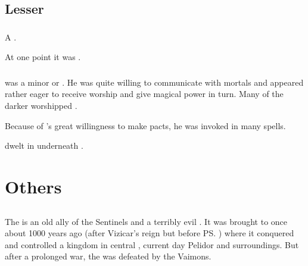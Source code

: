 \section{Lesser \XzaiShanns}





\subsection{\HothNrul}
\index{\HothNrul}
A \theraton. 

At one point it was . 





\subsection{\Yolbaoth}
\index{\Yolbaoth}
\Yolbaoth was a minor \xs or \theraton. 
He was quite willing to communicate with mortals and appeared rather eager to receive worship and give magical power in turn. 
Many of the darker  worshipped \Yolbaoth. 

Because of \Yolbaoth's great willingness to make pacts, he was invoked in many \draconic spells. 

\Yolbaoth dwelt in  underneath \Azmith. 















\chapter{Others}















\section{\Haskelek}
The \Haskelek{} is an old ally of the Sentinels and a terribly evil \daemon. 
It was brought to \Miith{} once about 1000 years ago (after Vizicar's reign but before \ps{\Belzir}) where it conquered and controlled a kingdom in central \Velcad{}, current day Pelidor and surroundings. 
But after a prolonged war, the \Haskelek{} was defeated by the Vaimons. 

